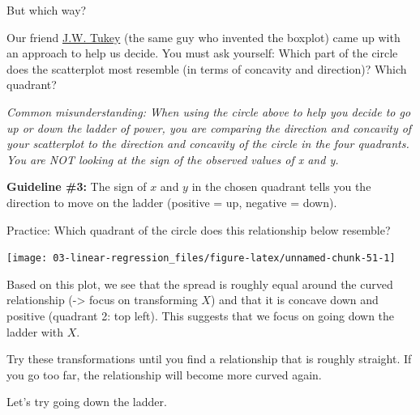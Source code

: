 \documentclass[
]{book}
\newenvironment{Shaded}{\begin{snugshade}}{\end{snugshade}}
\newcommand{\DataTypeTok}[1]{\textcolor[rgb]{0.13,0.29,0.53}{#1}}
\newcommand{\DecValTok}[1]{\textcolor[rgb]{0.00,0.00,0.81}{#1}}
\newcommand{\KeywordTok}[1]{\textcolor[rgb]{0.13,0.29,0.53}{\textbf{#1}}}
\newcommand{\NormalTok}[1]{#1}
\newcommand{\OperatorTok}[1]{\textcolor[rgb]{0.81,0.36,0.00}{\textbf{#1}}}
\newcommand{\StringTok}[1]{\textcolor[rgb]{0.31,0.60,0.02}{#1}}
\begin{document}
But which way?

Our friend \href{https://en.wikipedia.org/wiki/John_Tukey}{J.W. Tukey} (the same guy who invented the boxplot) came up with an approach to help us decide. You must ask yourself: Which part of the circle does the scatterplot most resemble (in terms of concavity and direction)? Which quadrant?

\emph{Common misunderstanding: When using the circle above to help you decide to go up or down the ladder of power, you are comparing the direction and concavity of your scatterplot to the direction and concavity of the circle in the four quadrants. You are NOT looking at the sign of the observed values of x and y.}

\textbf{Guideline \#3:} The sign of \(x\) and \(y\) in the chosen quadrant tells you the direction to move on the ladder (positive = up, negative = down).

Practice: Which quadrant of the circle does this relationship below resemble?

\begin{Shaded}
\end{Shaded}

\begin{center}\texttt{[image: 03-linear-regression\_files/figure-latex/unnamed-chunk-51-1]} \end{center}

Based on this plot, we see that the spread is roughly equal around the curved relationship (-\textgreater{} focus on transforming \(X\)) and that it is concave down and positive (quadrant 2: top left). This suggests that we focus on going down the ladder with \(X\).

Try these transformations until you find a relationship that is roughly straight. If you go too far, the relationship will become more curved again.

Let's try going down the ladder.
\end{document}
